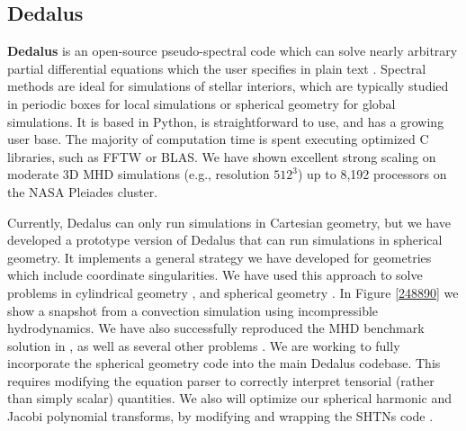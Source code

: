 \subsection{Dedalus}

\textbf{Dedalus} is an open-source pseudo-spectral code which can solve nearly arbitrary partial differential equations which the user specifies in plain text \citep[][source code at: dedalus-project.org]{Burns2016}. Spectral methods are ideal for simulations of stellar interiors, which are typically studied in periodic boxes for local simulations or spherical geometry for global simulations. It is based in Python, is straightforward to use, and has a growing user base. The majority of computation time is spent executing optimized C libraries, such as FFTW or BLAS. We have shown excellent strong scaling on moderate 3D MHD simulations (e.g., resolution $512^3$) up to 8,192 processors on the NASA Pleiades cluster.

Currently, Dedalus can only run simulations in Cartesian geometry, but we have developed a prototype version of Dedalus that can run simulations in spherical geometry. It implements a general strategy we have developed for geometries which include coordinate singularities. We have used this approach to solve problems in cylindrical geometry \cite{Vasil_2016}, and spherical geometry \citep[][submitted to JCP]{p}. In Figure \ref{248890} we show a snapshot from a convection simulation using incompressible hydrodynamics. We have also successfully reproduced the MHD benchmark solution in \cite{Marti_2014}, as well as several other problems \citep[][submitted to JCP]{s}. We are working to fully incorporate the spherical geometry code into the main Dedalus codebase. This requires modifying the equation parser to correctly interpret tensorial (rather than simply scalar) quantities. We also will optimize our spherical harmonic and Jacobi polynomial transforms, by modifying and wrapping the SHTNs code \cite{Schaeffer_2013}.
